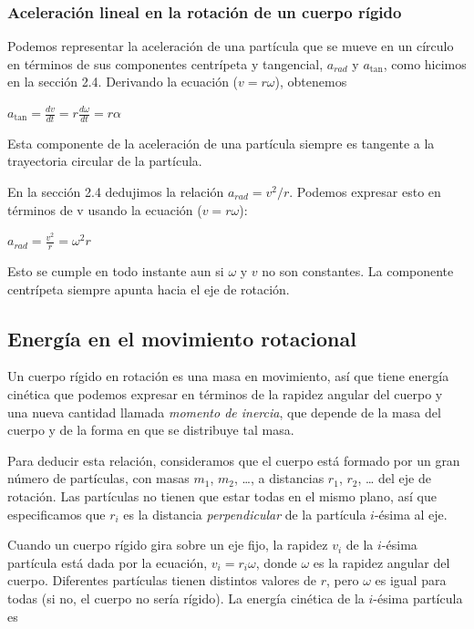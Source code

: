 \documentclass{article}
\newcommand{\newsubsection}[1]{
    \vspace{0.5cm}
    \color{sectionColor}
    \subsection{\bl{#1}}
    \color{black}
    \vspace{0.5cm}
}
\newcommand{\newtitle}[1]{
    \color{titleColor}
    \subsubsection{#1}
    \color{black}
}
\newcommand{\bl}[1]{\textbf{#1}}
\newcommand{\definicion}[1]{%
    \vspace{0.5cm}
    \begin{definicionbox}
        #1
    \end{definicionbox}
    \vspace{0.5cm}
}
\begin{document}
    \newtitle{Aceleración lineal en la rotación de un cuerpo rígido}

    \par Podemos representar la aceleración de una partícula que se mueve en un círculo en términos de sus componentes centrípeta y tangencial, $a_{rad}$ y $a_{\tan}$, como hicimos en la sección 2.4. Derivando la ecuación ($v = r \omega$), obtenemos

    \definicion{
        \centering
        \( a_{\tan} = \frac{dv}{dt} = r \frac{d \omega}{dt} = r \alpha \)
    }

    \noindent Esta componente de la aceleración de una partícula siempre es tangente a la trayectoria circular de la partícula.

    \vspace{0.2cm}

    \par En la sección 2.4 dedujimos la relación $a_{rad} = v^2/r$. Podemos expresar esto en términos de v usando la ecuación ($v = r \omega$):

    \definicion{
        \centering
        \( a_{rad} = \frac{v^2}{r} = \omega^2 r \)
    }

    \noindent Esto se cumple en todo instante aun si $\omega$ y $v$ no son constantes. La componente centrípeta siempre apunta hacia el eje de rotación.

    \newsubsection{Energía en el movimiento rotacional}

    \par Un cuerpo rígido en rotación es una masa en movimiento, así que tiene energía cinética que podemos expresar en términos de la rapidez angular del cuerpo y una nueva cantidad llamada \textit{momento de inercia}, que depende de la masa del cuerpo y de la forma en que se distribuye tal masa.

    \vspace{0.4cm}

    \par Para deducir esta relación, consideramos que el cuerpo está formado por un gran número de partículas, con masas $m_1$, $m_2$, …, a distancias $r_1$, $r_2$, … del eje de rotación. Las partículas no tienen que estar todas en el mismo plano, así que especiﬁcamos que $r_i$ es la distancia \textit{perpendicular} de la partícula $i$-ésima al eje.

    \vspace{0.1cm}

    \par Cuando un cuerpo rígido gira sobre un eje ﬁjo, la rapidez $v_i$ de la $i$-ésima partícula está dada por la ecuación, $v_i = r_i \omega$, donde $\omega$ es la rapidez angular del cuerpo. Diferentes partículas tienen distintos valores de $r$, pero $\omega$ es igual para todas (si no, el cuerpo no sería rígido). La energía cinética de la $i$-ésima partícula es
\end{document}
